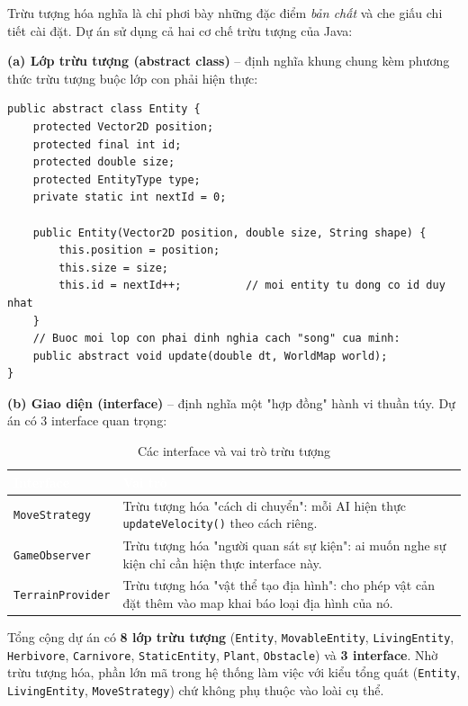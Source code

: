 \documentclass[12pt,a4paper]{report}
\newcommand{\keyword}[1]{\textcolor{primaryblue}{\textbf{#1}}}
\newcommand{\code}[1]{\texttt{\small #1}}
\begin{document}
Trừu tượng hóa nghĩa là chỉ phơi bày những đặc điểm \textit{bản chất} và che giấu chi tiết cài đặt. Dự án sử dụng cả hai cơ chế trừu tượng của Java:

\textbf{(a) Lớp trừu tượng (abstract class)} -- định nghĩa khung chung kèm phương thức trừu tượng buộc lớp con phải hiện thực:

\begin{lstlisting}[caption={Lớp gốc Entity với phương thức trừu tượng}]
public abstract class Entity {
    protected Vector2D position;
    protected final int id;
    protected double size;
    protected EntityType type;
    private static int nextId = 0;

    public Entity(Vector2D position, double size, String shape) {
        this.position = position;
        this.size = size;
        this.id = nextId++;          // moi entity tu dong co id duy nhat
    }
    // Buoc moi lop con phai dinh nghia cach "song" cua minh:
    public abstract void update(double dt, WorldMap world);
}
\end{lstlisting}

\textbf{(b) Giao diện (interface)} -- định nghĩa một "hợp đồng" hành vi thuần túy. Dự án có 3 interface quan trọng:

\begin{table}[H]
\centering
\caption{Các interface và vai trò trừu tượng}
\begin{tabular}{L{3.5cm} L{9cm}}
\toprule
{}\textcolor{white}{\textbf{Interface}} & \textcolor{white}{\textbf{Vai trò}} \\
\midrule
\code{MoveStrategy} & Trừu tượng hóa "cách di chuyển": mỗi AI hiện thực \code{updateVelocity()} theo cách riêng. \\
 \code{GameObserver} & Trừu tượng hóa "người quan sát sự kiện": ai muốn nghe sự kiện chỉ cần hiện thực interface này. \\
\code{TerrainProvider} & Trừu tượng hóa "vật thể tạo địa hình": cho phép vật cản đặt thêm vào map khai báo loại địa hình của nó. \\
\bottomrule
\end{tabular}
\end{table}

Tổng cộng dự án có \keyword{8 lớp trừu tượng} (\code{Entity}, \code{MovableEntity}, \code{LivingEntity}, \code{Herbivore}, \code{Carnivore}, \code{StaticEntity}, \code{Plant}, \code{Obstacle}) và \keyword{3 interface}. Nhờ trừu tượng hóa, phần lớn mã trong hệ thống làm việc với kiểu tổng quát (\code{Entity}, \code{LivingEntity}, \code{MoveStrategy}) chứ không phụ thuộc vào loài cụ thể.
\end{document}

